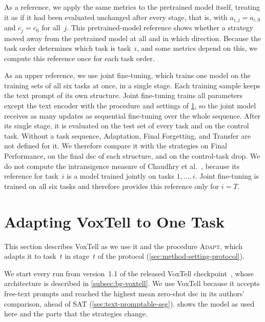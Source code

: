As a reference, we apply the same metrics to the pretrained model itself, treating it as if it had been evaluated unchanged after every stage, that is, with $a_{i,j} = a_{i,0}$ and $c_j = c_0$ for all~$j$.
This pretrained-model reference shows whether a strategy moved away from the pretrained model at all and in which direction.
Because the task order determines which task is task~$i$, and some metrics depend on this, we compute this reference once for each task order.

As an upper reference, we use joint fine-tuning, which trains one model on the training sets of all six tasks at once, in a single stage.
Each training sample keeps the text prompt of its own structure.
Joint fine-tuning trains all parameters except the text encoder with the procedure and settings of \cref{sec:method-adaptation}, so the joint model receives as many updates as sequential fine-tuning over the whole sequence.
After its single stage, it is evaluated on the test set of every task and on the control task.
Without a task sequence, Adaptation, Final Forgetting, and Transfer are not defined for it.
We therefore compare it with the strategies on Final Performance, on the final \gls{dsc} of each structure, and on the control-task drop.
We do not compute the intransigence measure of Chaudhry et al.~\cite{Chaudhry_2018}, because its reference for task~$i$ is a model trained jointly on tasks $1, \dots, i$.
Joint fine-tuning is trained on all six tasks and therefore provides this reference only for $i = T$.

\section{Adapting VoxTell to One Task}
\label{sec:method-adaptation}

This section describes VoxTell as we use it and the procedure \textsc{Adapt}, which adapts it to task~$t$ in stage~$t$ of the protocol (\cref{sec:method-setting-protocol}).

We start every run from version~1.1 of the released VoxTell checkpoint~\cite{rokuss2025voxtellfreetextpromptableuniversal,rokuss2026voxtellmodelcard}, whose architecture is described in \cref{subsec:bg-voxtell}.
We use VoxTell because it accepts free-text prompts and reached the highest mean zero-shot \gls{dsc} in its authors' comparison, ahead of SAT (\cref{sec:text-promptable-seg}).
 shows the model as used here and the parts that the strategies change.

